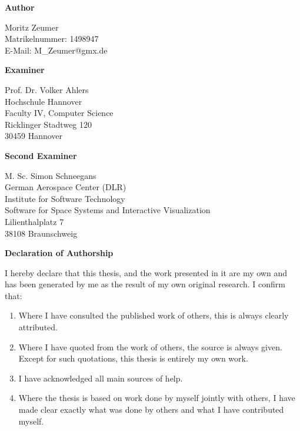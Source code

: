 \documentclass[11pt,DIV=12,BCOR=0mm,twoside,openright,headings=normal,%
  numbers=noenddot,headsepline,headinclude]{scrreprt}
\begin{document}
    \cleardoublepage

    \noindent
    {\sffamily\bfseries Author}

    \vspace*{.5\baselineskip}
    \noindent
    Moritz Zeumer\\
    Matrikelnummer: 1498947\\
    E-Mail: M\_Zeumer@gmx.de

    \vspace*{1\baselineskip}
    \noindent
    {\sffamily\bfseries Examiner}

    \vspace*{.5\baselineskip}
    \noindent
    Prof. Dr. Volker Ahlers\\
    Hochschule Hannover\\
    Faculty IV, Computer Science\\
    Ricklinger Stadtweg 120\\
    30459 Hannover

    \vspace*{1\baselineskip}
    \noindent
    {\sffamily\bfseries Second Examiner}

    \vspace*{.5\baselineskip}
    \noindent
    M. Sc. Simon Schneegans\\
    German Aerospace Center (DLR)\\
    Institute for Software Technology\\
    Software for Space Systems and Interactive Visualization\\
    Lilienthalplatz 7\\
    38108 Braunschweig

    \vfill
    \noindent
    {\sffamily\bfseries Declaration of Authorship}

    \vspace*{.5\baselineskip}
    \noindent
    I hereby declare that this thesis, and the work presented in it are my own and has been generated by me as the result of my own original research.
    I confirm that:

    \begin{enumerate}
        \item Where I have consulted the published work of others, this is always clearly attributed.

        \item Where I have quoted from the work of others, the source is always given.
        Except for such quotations, this thesis is entirely my own work.

        \item I have acknowledged all main sources of help.

        \item Where the thesis is based on work done by myself jointly with others, I have made clear exactly what was done by others and what I have contributed myself.
    \end{enumerate}
\end{document}

